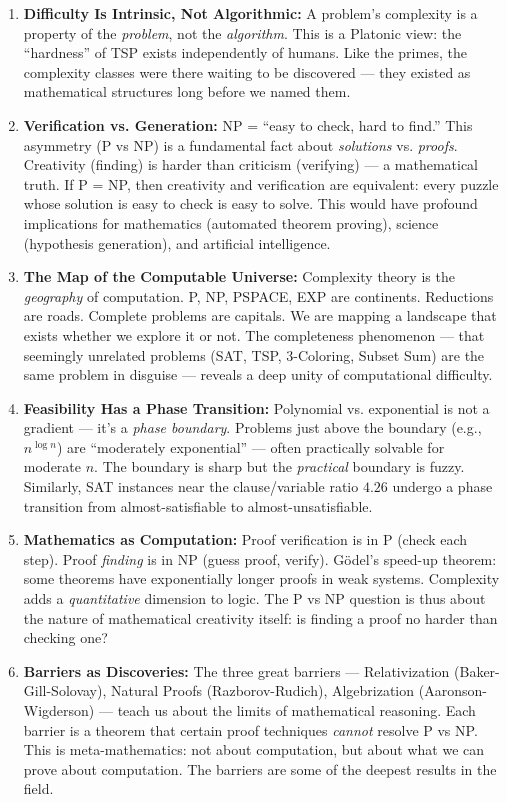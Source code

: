 \begin{enumerate}
\item \textbf{Difficulty Is Intrinsic, Not Algorithmic:} A problem's complexity is a property of the \emph{problem}, not the \emph{algorithm}. This is a Platonic view: the ``hardness'' of TSP exists independently of humans. Like the primes, the complexity classes were there waiting to be discovered — they existed as mathematical structures long before we named them.

\item \textbf{Verification vs. Generation:} NP = ``easy to check, hard to find.'' This asymmetry (P vs NP) is a fundamental fact about \emph{solutions} vs. \emph{proofs}. Creativity (finding) is harder than criticism (verifying) — a mathematical truth. If P = NP, then creativity and verification are equivalent: every puzzle whose solution is easy to check is easy to solve. This would have profound implications for mathematics (automated theorem proving), science (hypothesis generation), and artificial intelligence.

\item \textbf{The Map of the Computable Universe:} Complexity theory is the \emph{geography} of computation. P, NP, PSPACE, EXP are continents. Reductions are roads. Complete problems are capitals. We are mapping a landscape that exists whether we explore it or not. The completeness phenomenon — that seemingly unrelated problems (SAT, TSP, 3-Coloring, Subset Sum) are the same problem in disguise — reveals a deep unity of computational difficulty.

\item \textbf{Feasibility Has a Phase Transition:} Polynomial vs. exponential is not a gradient — it's a \emph{phase boundary}. Problems just above the boundary (e.g., $n^{\log n}$) are ``moderately exponential'' — often practically solvable for moderate $n$. The boundary is sharp but the \emph{practical} boundary is fuzzy. Similarly, SAT instances near the clause/variable ratio $4.26$ undergo a phase transition from almost-satisfiable to almost-unsatisfiable.

\item \textbf{Mathematics as Computation:} Proof verification is in P (check each step). Proof \emph{finding} is in NP (guess proof, verify). G\"odel's speed-up theorem: some theorems have exponentially longer proofs in weak systems. Complexity adds a \emph{quantitative} dimension to logic. The P vs NP question is thus about the nature of mathematical creativity itself: is finding a proof no harder than checking one?

\item \textbf{Barriers as Discoveries:} The three great barriers — Relativization (Baker-Gill-Solovay), Natural Proofs (Razborov-Rudich), Algebrization (Aaronson-Wigderson) — teach us about the limits of mathematical reasoning. Each barrier is a theorem that certain proof techniques \emph{cannot} resolve P vs NP. This is meta-mathematics: not about computation, but about what we can prove about computation. The barriers are some of the deepest results in the field.

\end{enumerate}

